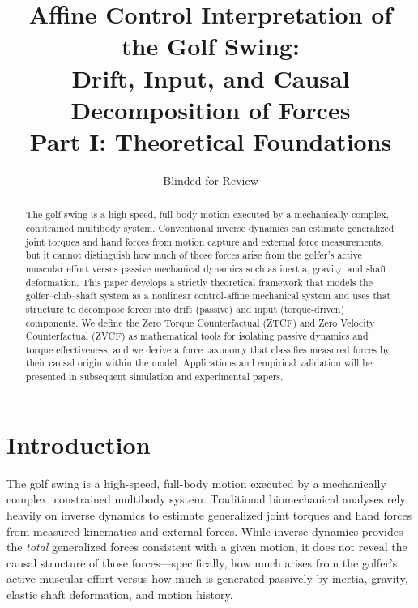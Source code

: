 \documentclass[12pt]{article}
\title{Affine Control Interpretation of the Golf Swing:\\
Drift, Input, and Causal Decomposition of Forces\\[0.5em]
\large Part I: Theoretical Foundations}
\author[1]{Blinded for Review}
\affil[1]{Institution Blinded for Review}
\date{}
\begin{document}
\maketitle

\begin{abstract}
The golf swing is a high-speed, full-body motion executed by a mechanically complex, constrained multibody system. Conventional inverse dynamics can estimate generalized joint torques and hand forces from motion capture and external force measurements, but it cannot distinguish how much of those forces arise from the golfer's active muscular effort versus passive mechanical dynamics such as inertia, gravity, and shaft deformation. This paper develops a strictly theoretical framework that models the golfer--club--shaft system as a nonlinear control-affine mechanical system and uses that structure to decompose forces into drift (passive) and input (torque-driven) components. We define the Zero Torque Counterfactual (ZTCF) and Zero Velocity Counterfactual (ZVCF) as mathematical tools for isolating passive dynamics and torque effectiveness, and we derive a force taxonomy that classifies measured forces by their causal origin within the model. Applications and empirical validation will be presented in subsequent simulation and experimental papers.
\end{abstract}


\section{Introduction}
\label{sec:intro}

The golf swing is a high-speed, full-body motion executed by a mechanically complex, constrained multibody system. Traditional biomechanical analyses rely heavily on inverse dynamics to estimate generalized joint torques and hand forces from measured kinematics and external forces. While inverse dynamics provides the \emph{total} generalized forces consistent with a given motion, it does not reveal the causal structure of those forces---specifically, how much arises from the golfer's active muscular effort versus how much is generated passively by inertia, gravity, elastic shaft deformation, and motion history.
\end{document}

